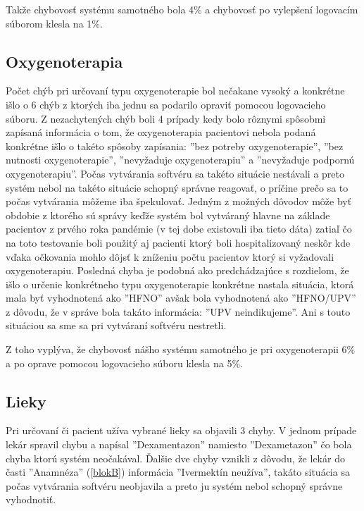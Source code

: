 Takže chybovosť systému samotného bola 4\% a chybovosť po vylepšení logovacím súborom klesla na 1\%.   

\subsection{Oxygenoterapia}

Počet chýb pri určovaní typu oxygenoterapie bol nečakane vysoký a konkrétne išlo o 6 chýb z ktorých iba jednu sa podarilo opraviť pomocou logovacieho súboru. Z nezachytených chýb boli 4 prípady kedy bolo rôznymi spôsobmi zapísaná informácia o tom, že oxygenoterapia pacientovi nebola podaná konkrétne išlo o takéto spôsoby zapísania: ''bez potreby oxygenoterapie'', ''bez nutnosti oxygenoterapie'', ''nevyžaduje oxygenoterapiu'' a ''nevyžaduje podpornú oxygenoterapiu''. Počas vytvárania softvéru sa takéto situácie nestávali a preto systém nebol na takéto situácie schopný správne reagovať, o príčine prečo sa to počas vytvárania môžeme iba špekulovať. Jedným z možných dôvodov môže byť obdobie z ktorého sú správy keďže systém bol vytváraný hlavne na základe pacientov z prvého roka pandémie (v tej dobe existovali iba tieto dáta) zatiaľ čo na toto testovanie boli použitý aj pacienti ktorý boli hospitalizovaný neskôr kde vďaka očkovania mohlo dôjsť k zníženiu počtu pacientov ktorý si vyžadovali oxygenoterapiu. Posledná chyba je podobná ako predchádzajúce s rozdielom, že išlo o určenie konkrétneho typu oxygenoterapie konkrétne nastala situácia, ktorá mala byť vyhodnotená ako ''HFNO'' avšak bola vyhodnotená ako ''HFNO/UPV'' z dôvodu, že v správe bola takáto informácia: ''UPV neindikujeme''. Ani s touto situáciou sa sme sa pri vytváraní softvéru nestretli.  

Z toho vyplýva, že chybovosť nášho systému samotného je pri oxygenoterapii 6\% a po oprave pomocou logovacieho súboru klesla na 5\%. 

\subsection{Lieky}

Pri určovaní či pacient užíva vybrané lieky sa objavili 3 chyby. V jednom prípade lekár spravil chybu a napísal ''Dexamentazon'' namiesto ''Dexametazon'' čo bola chyba ktorú systém neočakával. Ďalšie dve chyby vznikli z dôvodu, že lekár do časti ''Anamnéza'' (\ref{blokB}) informácia ''Ivermektín neužíva'', takáto situácia sa počas vytvárania softvéru neobjavila a preto ju systém nebol schopný správne vyhodnotiť.


